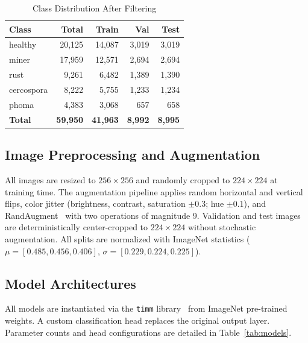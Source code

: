 \documentclass[conference]{IEEEtran}
\begin{document}
\begin{table}[htbp]
  \centering
  \caption{Class Distribution After Filtering}
  \label{tab:classdist}
  \begin{tabular}{lrrrr}
    \toprule
    \textbf{Class} & \textbf{Total} & \textbf{Train} & \textbf{Val} & \textbf{Test} \\
    \midrule
    healthy    & 20{,}125 & 14{,}087 & 3{,}019 & 3{,}019 \\
    miner      & 17{,}959 & 12{,}571 & 2{,}694 & 2{,}694 \\
    rust       &  9{,}261 &  6{,}482 & 1{,}389 & 1{,}390 \\
    cercospora &  8{,}222 &  5{,}755 & 1{,}233 & 1{,}234 \\
    phoma      &  4{,}383 &  3{,}068 &   657   &   658   \\
    \midrule
    \textbf{Total} & \textbf{59{,}950} & \textbf{41{,}963} & \textbf{8{,}992} & \textbf{8{,}995} \\
    \bottomrule
  \end{tabular}
\end{table}

\subsection{Image Preprocessing and Augmentation}

All images are resized to $256 \times 256$ and randomly cropped to
$224 \times 224$ at training time. The augmentation pipeline applies random
horizontal and vertical flips, color jitter (brightness, contrast,
saturation $\pm 0.3$; hue $\pm 0.1$), and RandAugment~\cite{cubuk2020}
with two operations of magnitude 9. Validation and test images are
deterministically center-cropped to $224 \times 224$ without stochastic
augmentation. All splits are normalized with ImageNet statistics
($\mu = [0.485, 0.456, 0.406]$, $\sigma = [0.229, 0.224, 0.225]$).

\subsection{Model Architectures}

All models are instantiated via the \texttt{timm} library~\cite{rw2019timm}
from ImageNet pre-trained weights. A custom classification head replaces the
original output layer. Parameter counts and head configurations are detailed
in Table~\ref{tab:models}.
\end{document}

